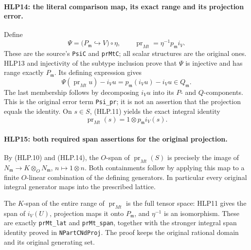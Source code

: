 \paragraph{HLP14: the literal comparison map, its exact range and its projection error.}
\label{claim:HLP14}
Define
\[
 \Psi=\bigl(P_{\mathfrak m}\hookrightarrow V\bigr)\circ\eta,
 \qquad \operatorname{pr}_{Mt}=\eta^{-1}p_{\mathfrak m}i_V.
                                                               \tag{HLP.12}
\]
These are the source's \texttt{Psi\allowbreak C} and \texttt{pr\allowbreak Mt\allowbreak C}; all scalar
structures are the original ones. HLP13 and injectivity of the
subtype inclusion prove that \(\Psi\) is injective and has range
exactly \(P_{\mathfrak m}\). Its defining expression gives
\[
       \Psi(\operatorname{pr}_{Mt}u)-i_Vu
         =p_{\mathfrak m}(i_Vu)-i_Vu\in Q_{\mathfrak m}. \tag{HLP.13}
\]
The last membership follows by decomposing \(i_Vu\) into its
\(P\)- and \(Q\)-components. This is the original error term
\texttt{Psi\_\allowbreak pr}; it is not an assertion that the projection equals
the identity. On \(s\in S\), (HLP.11) yields the exact integral
identity
\[
       \operatorname{pr}_{Mt}(s)=1\otimes p_{\mathfrak m}i_V(s).
                                                               \tag{HLP.14}
\]

\paragraph{HLP15: both required span assertions for the original projection.}
\label{claim:HLP15}
By (HLP.10) and (HLP.14), the \(O\)-span of
\(\operatorname{pr}_{Mt}(S)\) is precisely the image of
\(N_{\mathfrak m}\to K\otimes_ON_{\mathfrak m}\),
\(n\mapsto1\otimes n\). Both containments follow by applying this
map to a finite \(O\)-linear combination of the defining
generators. In particular every original integral generator maps
into the prescribed lattice.

The \(K\)-span of the entire range of \(\operatorname{pr}_{Mt}\)
is the full tensor space: HLP11 gives the span of \(i_V(U)\),
projection maps it onto \(P_{\mathfrak m}\), and \(\eta^{-1}\)
is an isomorphism. These are exactly \texttt{pr\allowbreak Mt\_\allowbreak lat} and
\texttt{pr\allowbreak Mt\_\allowbreak span}, together with the stronger integral span
identity proved in \texttt{NPart\allowbreak CNd\allowbreak Proj}. The proof keeps the
original rational domain and its original generating set.


